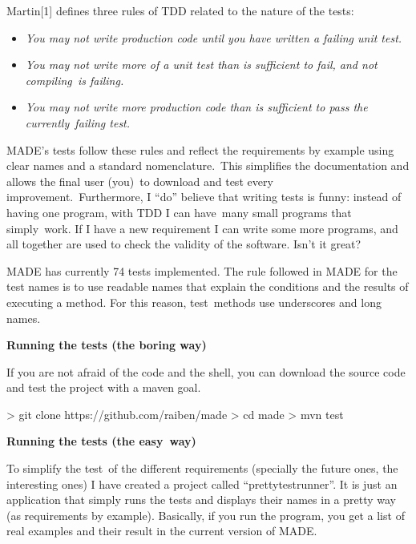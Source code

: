 \documentclass[a4paper]{article}
\newcommand\textstyleStrongEmphasis[1]{\textbf{#1}}
\newcommand\textstyleEmphasis[1]{\textit{#1}}
\newcommand\liststyleLxi{%
\renewcommand\labelitemi{{\textbullet}}
\renewcommand\labelitemii{{\textbullet}}
\renewcommand\labelitemiii{{\textbullet}}
\renewcommand\labelitemiv{{\textbullet}}
}
\begin{document}
Martin[1] defines three rules of TDD related to the nature of the tests:

\liststyleLxi
\begin{itemize}
\item \textstyleEmphasis{You may not write production code until you
have written a failing unit test.} 
\item \textstyleEmphasis{You may not write more of a unit test than is
sufficient to fail, and not compiling~is failing.} 
\item \textstyleEmphasis{You may not write more production code than is
sufficient to pass the currently~failing test.} 
\end{itemize}
MADE{\textquoteright}s tests follow these rules and reflect the
requirements by example using clear names and a standard
nomenclature.~This simplifies the documentation and allows the final
user (you)~to download and test every improvement.~Furthermore, I
{\textquotedblleft}do{\textquotedblright} believe that writing tests is
funny: instead of having one program, with TDD I can have~many small
programs that simply~work. If I have a new requirement I can write some
more programs, and all together are used to check the validity of the
software. Isn{\textquoteright}t it great?

MADE has currently 74 tests implemented. The rule followed in MADE for
the test names is to use readable names that explain the conditions and
the results of executing a method. For this reason, test~methods use
underscores and long names.

\textstyleStrongEmphasis{Running the tests (the boring way)}

If you are not afraid of the code and the shell, you can download the
source code and test the project with a maven goal.

{\textgreater} git clone https://github.com/raiben/made\newline
{\textgreater} cd made\newline
{\textgreater} mvn test

\textstyleStrongEmphasis{Running the tests (the easy~way)}

To simplify the test~of the different requirements (specially the future
ones, the interesting ones) I have created a project called
{\textquotedblleft}prettytestrunner{\textquotedblright}. It is just an
application that simply runs the tests and displays their names in a
pretty way (as requirements by example). Basically, if you run the
program, you get a list of real examples and their result in the
current version of MADE.
\end{document}
